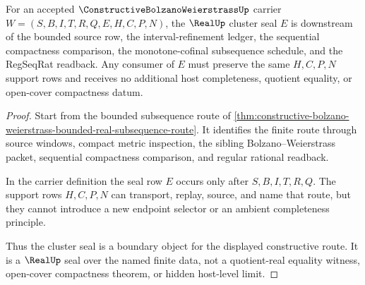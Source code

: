 \begin{theorem}
\label{thm:constructive-bolzano-weierstrass-cluster-seal-boundary}
For an accepted $\ConstructiveBolzanoWeierstrassUp$ carrier $W=(S,B,I,T,R,Q,E,H,C,P,N)$, the $\RealUp$ cluster seal $E$ is downstream of the bounded source row, the interval-refinement ledger, the sequential compactness comparison, the monotone-cofinal subsequence schedule, and the RegSeqRat readback. Any consumer of $E$ must preserve the same $H,C,P,N$ support rows and receives no additional host completeness, quotient equality, or open-cover compactness datum.
\end{theorem}
\begin{proof}
Start from the bounded subsequence route of \autoref{thm:constructive-bolzano-weierstrass-bounded-real-subsequence-route}. It identifies the finite route through source windows, compact metric inspection, the sibling Bolzano--Weierstrass packet, sequential compactness comparison, and regular rational readback.

In the carrier definition the seal row $E$ occurs only after $S,B,I,T,R,Q$. The support rows $H,C,P,N$ can transport, replay, source, and name that route, but they cannot introduce a new endpoint selector or an ambient completeness principle.

Thus the cluster seal is a boundary object for the displayed constructive route. It is a $\RealUp$ seal over the named finite data, not a quotient-real equality witness, open-cover compactness theorem, or hidden host-level limit.
\end{proof}


